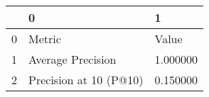 \begin{tabular}{lll}
\toprule
 & 0 & 1 \\
\midrule
0 & Metric & Value \\
1 & Average Precision & 1.000000 \\
2 & Precision at 10 (P@10) & 0.150000 \\
\bottomrule
\end{tabular}
